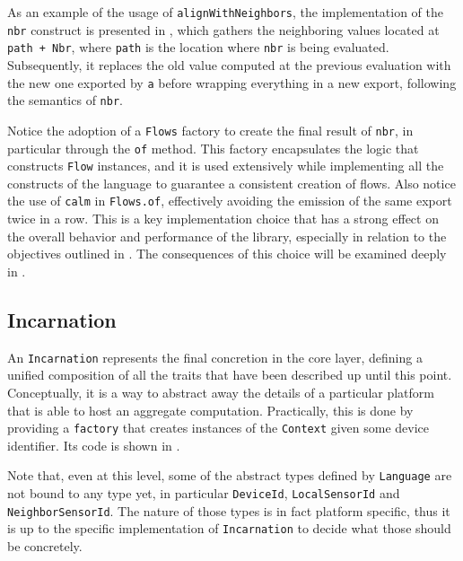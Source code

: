 As an example of the usage of \texttt{alignWithNeighbors}, the implementation of the \texttt{nbr} construct is presented in , which gathers the neighboring values located at \texttt{path + Nbr}, where \texttt{path} is the location where \texttt{nbr} is being evaluated.
%
Subsequently, it replaces the old value computed at the previous evaluation with the new one exported by \texttt{a} before wrapping everything in a new export, following the semantics of \texttt{nbr}.
%

%
Notice the adoption of a \texttt{Flows} factory to create the final result of \texttt{nbr}, in particular through the \texttt{of} method.
%
This factory encapsulates the logic that constructs \texttt{Flow} instances, and it is used extensively while implementing all the constructs of the language to guarantee a consistent creation of flows.
%
Also notice the use of \texttt{calm} in \texttt{Flows.of}, effectively avoiding the emission of the same export twice in a row.
%
This is a key implementation choice that has a strong effect on the overall behavior and performance of the library, especially in relation to the objectives outlined in .
%
The consequences of this choice will be examined deeply in .

\subsection{Incarnation}

An \texttt{Incarnation} represents the final concretion in the core layer, defining a unified composition of all the traits that have been described up until this point.
%
Conceptually, it is a way to abstract away the details of a particular platform that is able to host an aggregate computation.
%
Practically, this is done by providing a \texttt{factory} that creates instances of the \texttt{Context} given some device identifier.
%
Its code is shown in .
%


Note that, even at this level, some of the abstract types defined by \texttt{Language} are not bound to any type yet, in particular \texttt{DeviceId}, \texttt{LocalSensorId} and \texttt{NeighborSensorId}.
%
The nature of those types is in fact platform specific, thus it is up to the specific implementation of \texttt{Incarnation} to decide what those should be concretely.

